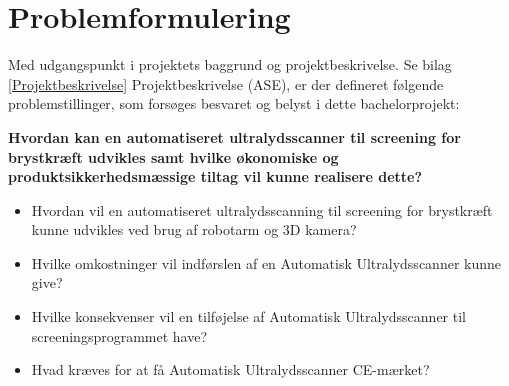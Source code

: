 \newpage

\section{Problemformulering}
Med udgangspunkt i projektets baggrund og projektbeskrivelse. Se bilag  \ref{Projektbeskrivelse} Projektbeskrivelse (ASE), er der defineret følgende problemstillinger, som forsøges besvaret og belyst i dette bachelorprojekt:

\textbf{Hvordan kan en automatiseret ultralydsscanner til screening for brystkræft udvikles samt hvilke økonomiske og produktsikkerhedsmæssige tiltag vil kunne realisere dette?}

\let\labelitemi\labelitemii
\begin{itemize}
\item Hvordan vil en automatiseret ultralydsscanning til screening for brystkræft kunne udvikles ved brug af robotarm og 3D kamera?
\item Hvilke omkostninger vil indførslen af en Automatisk Ultralydsscanner kunne give? 
\item Hvilke konsekvenser vil en tilføjelse af Automatisk Ultralydsscanner til screeningsprogrammet have?
\item Hvad kræves for at få Automatisk Ultralydsscanner CE-mærket? 
\end{itemize}
